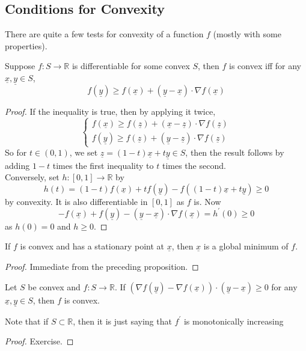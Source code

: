 \subsection{Conditions for Convexity}
There are quite a few tests for convexity of a function $f$ (mostly with some properties).
\begin{proposition}
    Suppose $f:S\to\mathbb R$ is differentiable for some convex $S$, then $f$ is convex iff for any $\underline{x},\underline{y}\in S$,
    $$f(\underline{y})\ge f(\underline{x})+(\underline{y}-\underline{x})\cdot\nabla f(\underline{x})$$
\end{proposition}
\begin{proof}
    If the inequality is true, then by applying it twice,
    $$\begin{cases}
        f(\underline{x})\ge f(\underline{z})+(\underline{x}-\underline{z})\cdot\nabla f(\underline{z})\\
        f(\underline{y})\ge f(\underline{z})+(\underline{y}-\underline{z})\cdot\nabla f(\underline{z})
    \end{cases}$$
    So for $t\in (0,1)$, we set $\underline{z}=(1-t)\underline{x}+t\underline{y}\in S$, then the result follows by adding $1-t$ times the first inequality to $t$ times the second.\\
    Conversely, set $h:[0,1]\to\mathbb R$ by
    $$h(t)=(1-t)f(\underline{x})+tf(\underline{y})-f((1-t)\underline{x}+t\underline{y})\ge 0$$
    by convexity.
    It is also differentiable in $[0,1]$ as $f$ is.
    Now
    $$-f(\underline{x})+f(\underline{y})-(\underline{y}-\underline{x})\cdot\nabla f(\underline{x})=h^\prime(0)\ge 0$$
    as $h(0)=0$ and $h\ge 0$.
\end{proof}
\begin{corollary}
    If $f$ is convex and has a stationary point at $\underline{x}$, then $\underline{x}$ is a global minimum of $f$.
\end{corollary}
\begin{proof}
    Immediate from the preceding proposition.
\end{proof}
\begin{proposition}
    Let $S$ be convex and $f:S\to\mathbb R$.
    If $(\nabla f(\underline{y})-\nabla f(\underline{x}))\cdot (\underline{y}-\underline{x})\ge 0$ for any $\underline{x},\underline{y}\in S$, then $f$ is convex.
\end{proposition}
Note that if $S\subset\mathbb R$, then it is just saying that $f^\prime$ is monotonically increasing
\begin{proof}
    Exercise.
\end{proof}
